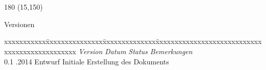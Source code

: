 
\chapter*{}
\label{chap:versionen}

\begin{textblock}{180} (15,150)
\color{black}
\begin{huge}
Versionen
\end{huge}
\vspace{10mm}

\fontsize{10pt}{18pt}\selectfont
\begin{tabbing}
xxxxxxxxxxx\=xxxxxxxxxxxxxxx\=xxxxxxxxxxxxxx\=xxxxxxxxxxxxxxxxxxxxxxxxxxxxxxxxxxxxxxxxxxxxxxx \kill
\textit{Version}	\> \textit{Datum}	\> \textit{Status}		\> \textit{Bemerkungen}\\
0.1	.2014	\> Entwurf		\> Initiale Erstellung des Dokuments\\
\end{tabbing}

\end{textblock}
